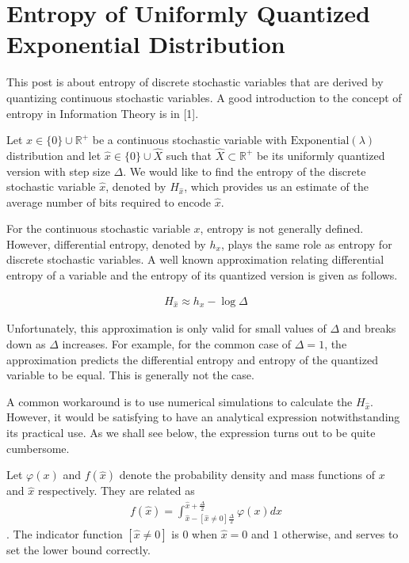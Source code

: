 \section{Entropy of Uniformly Quantized Exponential Distribution}

This post is about entropy of discrete stochastic variables that are derived by quantizing continuous stochastic variables. A good introduction to the concept of entropy in Information Theory is in [1].

Let $x \in \{0\} \cup \mathbb{R}^+ $ be a continuous stochastic variable with $\text{Exponential}(\lambda)$ distribution and let $\hat{x} \in \{0\} \cup \hat{X}$ such that $\hat{X} \subset \mathbb{R}^+$ be its uniformly quantized version with step size $\Delta$. We would like to find the entropy of the discrete stochastic variable $\hat{x}$, denoted by $H_{\hat{x}}$, which provides us an estimate of the average number of bits required to encode $\hat{x}$.

For the continuous stochastic variable $x$, entropy is not generally defined. However, differential entropy, denoted by $h_x$, plays the same role as entropy for discrete stochastic variables. A well known approximation relating differential entropy of a variable and the entropy of its quantized version is given as follows.

\begin{align} H_{\hat{x}} \approx h_x - \log \Delta \end{align}

Unfortunately, this approximation is only valid for small values of $\Delta$ and breaks down as $\Delta$ increases. For example, for the common case of $\Delta = 1$, the approximation predicts the differential entropy and entropy of the quantized variable to be equal. This is generally not the case.

A common workaround is to use numerical simulations to calculate the $H_{\hat{x}}$. However, it would be satisfying to have an analytical expression notwithstanding its practical use. As we shall see below, the expression turns out to be quite cumbersome.

Let $\varphi(x)$ and $f(\hat{x})$ denote the probability density and mass functions of $x$ and $\hat{x}$ respectively. They are related as 
\begin{align}f(\hat{x}) = \int_{\hat{x} - [\hat{x} \neq 0]\frac{\Delta}{2}}^{\hat{x} + \frac{\Delta}{2}} \varphi(x) dx\end{align}. 
The indicator function $[\hat{x} \neq 0]$ is $0$ when $\hat{x} = 0$ and $1$ otherwise, and serves to set the lower bound correctly.

